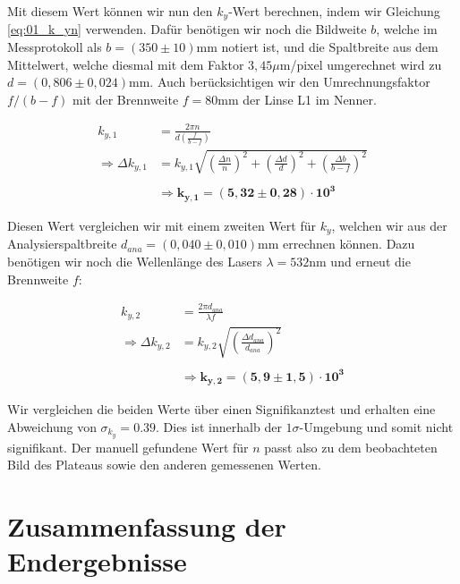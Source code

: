 \documentclass{article}
\begin{document}
\clearpage
\newpage

Mit diesem Wert können wir nun den $k_y$-Wert berechnen, indem wir Gleichung \ref{eq:01_k_yn} verwenden. Dafür benötigen wir noch die Bildweite $b$, welche im Messprotokoll als $b=(350\pm10)$mm notiert ist, und die Spaltbreite aus dem Mittelwert, welche diesmal mit dem Faktor $3,45 \mu$m/pixel umgerechnet wird zu $d = (0,806 \pm 0,024)$mm. Auch berücksichtigen wir den Umrechnungsfaktor $f / (b - f)$ mit der Brennweite $f = 80$mm der Linse L1 im Nenner.

\begin{equation}
    \begin{split}
        k_{y,1} &= \frac{2 \pi n}{d \left( \frac{f}{b-f} \right)} \\
        \Rightarrow \Delta k_{y,1} &= k_{y,1} \sqrt{\left( \frac{\Delta n}{n} \right)^2 + \left( \frac{\Delta d}{d} \right)^2 + \left( \frac{\Delta b}{b-f} \right)^2} \\ \\
        &\Rightarrow \bm{k_{y,1} = (5,32 \pm 0,28) \cdot 10^{3}}
    \end{split}
\end{equation}

Diesen Wert vergleichen wir mit einem zweiten Wert für $k_y$, welchen wir aus der Analysierspaltbreite $d_{ana} = (0,040 \pm 0,010)$mm errechnen können. Dazu benötigen wir noch die Wellenlänge des Lasers $\lambda = 532$nm und erneut die Brennweite $f$:

\begin{equation}
    \begin{split}
        k_{y,2} &= \frac{2 \pi d_{ana}}{\lambda f} \\
        \Rightarrow \Delta k_{y,2} &= k_{y,2} \sqrt{\left( \frac{\Delta d_{ana}}{d_{ana}} \right)^2} \\ \\
        &\Rightarrow \bm{k_{y,2} = (5,9 \pm 1,5) \cdot 10^{3}}
    \end{split}
\end{equation}

Wir vergleichen die beiden Werte über einen Signifikanztest und erhalten eine Abweichung von $\sigma_{k_y} = 0.39$. Dies ist innerhalb der $1\sigma$-Umgebung und somit nicht signifikant. Der manuell gefundene Wert für $n$ passt also zu dem beobachteten Bild des Plateaus sowie den anderen gemessenen Werten. 


\newpage
\section{Zusammenfassung der Endergebnisse}
\end{document}
